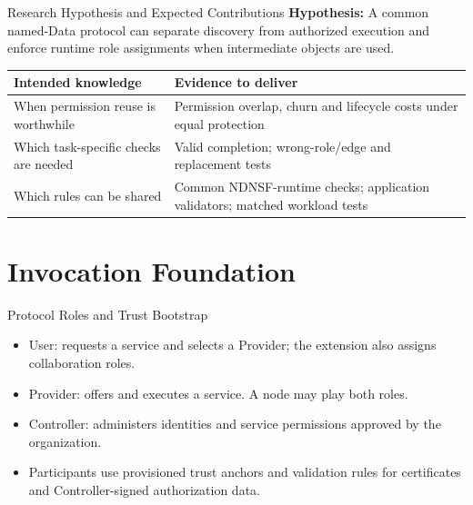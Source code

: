 \begin{frame}{Research Hypothesis and Expected Contributions}
\small
\textbf{Hypothesis:} A common named-Data protocol can separate discovery from authorized execution and enforce runtime role assignments when intermediate objects are used.
\par\vspace{3mm}
\begin{tabularx}{\linewidth}{>{\raggedright\arraybackslash}p{.38\linewidth}>{\raggedright\arraybackslash}X}
\toprule Intended knowledge & Evidence to deliver\\\midrule
When permission reuse is worthwhile & Permission overlap, churn and lifecycle costs under equal protection\\\midrule
Which task-specific checks are needed & Valid completion; wrong-role/edge and replacement tests\\\midrule
Which rules can be shared & Common NDNSF-runtime checks; application validators; matched workload tests\\\bottomrule
\end{tabularx}
\vspace{3mm}
\end{frame}

\section{Invocation Foundation}
\begin{frame}{Protocol Roles and Trust Bootstrap}
\begin{itemize}
\item User: requests a service and selects a Provider; the extension also assigns collaboration roles.
\item Provider: offers and executes a service. A node may play both roles.
\item Controller: administers identities and service permissions approved by the organization.
\item Participants use provisioned trust anchors and validation rules for certificates and Controller-signed authorization data.
\end{itemize}
\vspace{3mm}
\end{frame}

